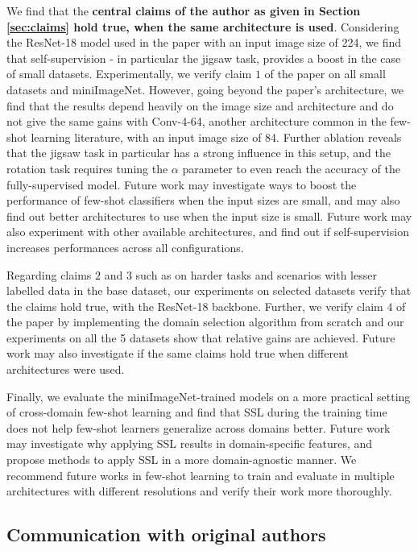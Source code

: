 We find that the \textbf{central claims of the author as given in Section \ref{sec:claims} hold true, when the same architecture is used}. Considering the ResNet-18 model used in the paper with an input image size of 224, we find that self-supervision - in particular the jigsaw task, provides a boost in the case of small datasets. Experimentally, we verify claim $1$ of the paper on all small datasets and miniImageNet. However, going beyond the paper's architecture, we find that the results depend heavily on the image size and architecture and do not give the same gains with Conv-4-64, another architecture common in the few-shot learning literature, with an input image size of 84. Further ablation reveals that the jigsaw task in particular has a strong influence in this setup, and the rotation task requires tuning the $\alpha$ parameter to even reach the accuracy of the fully-supervised model. Future work may investigate ways to boost the performance of few-shot classifiers when the input sizes are small, and may also find out better architectures to use when the input size is small. Future work may also experiment with other available architectures, and find out if self-supervision increases performances across all configurations.

Regarding claims $2$ and $3$ such as on harder tasks and scenarios with lesser labelled data in the base dataset, our experiments on selected datasets verify that the claims hold true, with the ResNet-18 backbone. Further, we verify claim $4$ of the paper by implementing the domain selection algorithm from scratch and our experiments on all the 5 datasets show that relative gains are achieved. Future work may also investigate if the same claims hold true when different architectures were used. 

Finally, we evaluate the miniImageNet-trained models on a more practical setting of cross-domain few-shot learning and find that SSL during the training time does not help few-shot learners generalize across domains better. Future work may investigate why applying SSL results in domain-specific features, and propose methods to apply SSL in a more domain-agnostic manner.  We recommend future works in few-shot learning to train and evaluate in multiple architectures with different resolutions and verify their work more thoroughly.

\subsection{Communication with original authors}

